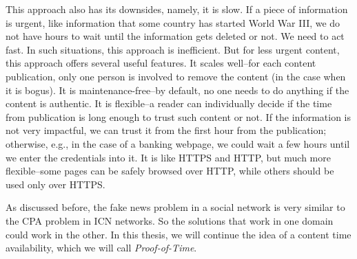 This approach also has its downsides, namely, it is slow. If a piece of information is urgent, like information that some country has started World War III, we do not have hours to wait until the information gets deleted or not. We need to act fast. In such situations, this approach is inefficient. But for less urgent content, this approach offers several useful features. It scales well--for each content publication, only one person is involved to remove the content (in the case when it is bogus). It is maintenance-free--by default, no one needs to do anything if the content is authentic. It is flexible--a reader can individually decide if the time from publication is long enough to trust such content or not. If the information is not very impactful, we can trust it from the first hour from the publication; otherwise, e.g., in the case of a banking webpage, we could wait a few hours until we enter the credentials into it. It is like HTTPS and HTTP, but much more flexible--some pages can be safely browsed over HTTP, while others should be used only over HTTPS. 

As discussed before, the fake news problem in a social network is very similar to the CPA problem in ICN networks. So the solutions that work in one domain could work in the other. In this thesis, we will continue the idea of a content time availability, which we will call \emph{Proof-of-Time}.